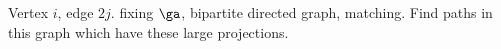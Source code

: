 
Vertex $i$, edge $2j$. 
fixing $\ga$, bipartite directed graph, matching. 
Find paths in this graph which have these large projections. 



%
 
%
%
